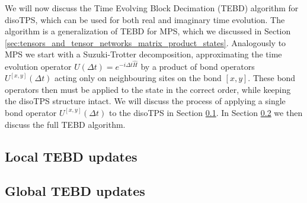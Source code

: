 We will now discuss the Time Evolving Block Decimation (TEBD) algorithm for disoTPS, which can be used for both real and imaginary time evolution. The algorithm is a generalization of TEBD for MPS, which we discussed in Section \ref{sec:tensors_and_tensor_networks_matrix_product_states}. Analogously to MPS we start with a Suzuki-Trotter decomposition, approximating the time evolution operator $U\left(\Delta t\right) = e^{-i\Delta t \hat{H}}$ by a product of bond operators $U^{[x, y]}\left(\Delta t\right)$ acting only on neighbouring sites on the bond $[x, y]$. These bond operators then must be applied to the state in the correct order, while keeping the disoTPS structure intact. We will discuss the process of applying a single bond operator $U^{[x,y]}\left(\Delta t\right)$ to the disoTPS in Section \ref{sec:disoTPS_TEBD_local_updates}. In Section \ref{sec:disoTPS_TEBD_global_updates} we then discuss the full TEBD algorithm.

\subsection{Local TEBD updates}
\label{sec:disoTPS_TEBD_local_updates}


\subsection{Global TEBD updates}
\label{sec:disoTPS_TEBD_global_updates}
